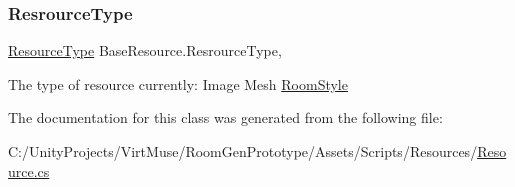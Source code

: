 \subsubsection{\texorpdfstring{Resrource\+Type}{ResrourceType}}
{\footnotesize\ttfamily \mbox{\hyperlink{namespace_virt_muse_web_1_1_models_ab185d30c831a1ac813a53670c29d6397}{Resource\+Type}} Base\+Resource.\+Resrource\+Type\hspace{0.3cm}{\ttfamily [get]}, {\ttfamily [set]}}



The type of resource currently\+: Image Mesh \mbox{\hyperlink{class_room_style}{Room\+Style}} 



The documentation for this class was generated from the following file\+:\begin{DoxyCompactItemize}
\item 
C\+:/\+Unity\+Projects/\+Virt\+Muse/\+Room\+Gen\+Prototype/\+Assets/\+Scripts/\+Resources/\mbox{\hyperlink{_resource_8cs}{Resource.\+cs}}\end{DoxyCompactItemize}
